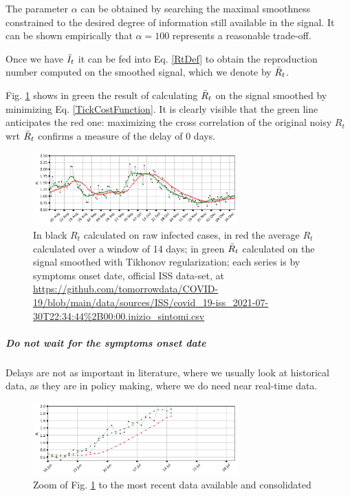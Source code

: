 \documentclass[graybox]{svmult}
\begin{document}
The parameter $\alpha$ can be obtained by searching the maximal smoothness constrained to the desired degree of information still available in the signal. It can be shown empirically that $\alpha = 100$ represents a reasonable trade-off.

Once we have $\Bar{I}_t$ it can be fed into Eq. \ref{RtDef} to obtain the reproduction number computed on the smoothed signal, which we denote by $\Bar{R}_t$.

Fig. \ref{naive_Rt_symptoms_onset_smoothed} shows in green the result of calculating $\Bar{R}_t$ on the signal smoothed by minimizing Eq. \ref{TickCostFunction}. It is clearly visible that the green line anticipates the red one: maximizing the cross correlation of the original noisy $R_t$ wrt $\Bar{R}_t$ confirms a measure of the delay of 0 days.

\begin{figure}[t]
\center
\includegraphics[width=0.7\textwidth]{Rt_images/naive_Rt_symptoms_onset_smoothed.jpg}
\caption{In black $R_{t}$ calculated on raw infected cases, in red the average $R_t$ calculated over a window of 14 days; in green $\Bar{R}_{t}$ calculated on the signal smoothed with Tikhonov regularization; each series is by symptoms onset date, official ISS data-set, at \url{https://github.com/tomorrowdata/COVID-19/blob/main/data/sources/ISS/covid_19-iss_2021-07-30T22:34:44\%2B00:00.inizio_sintomi.csv}}
\label{naive_Rt_symptoms_onset_smoothed}
\end{figure}

\subparagraph{Do not wait for the symptoms onset date}
\label{notification_date}

Delays are not as important in literature, where we usually look at historical data, as they are in policy making, where we do need near real-time data.

\begin{figure}[t]
\center
\includegraphics[width=0.7\textwidth]{Rt_images/naive_Rt_symptoms_onset_smoothed_zoom.jpg}
\caption{Zoom of Fig. \ref{naive_Rt_symptoms_onset_smoothed} to the most recent data available and consolidated}
\label{naive_Rt_symptoms_onset_smoothed_zoom}
\end{figure}
\end{document}
